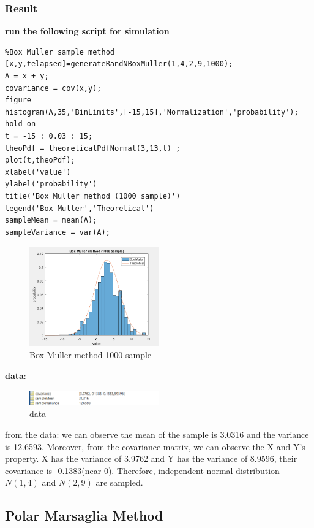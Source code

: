 \documentclass[twoside]{article}
\begin{document}
\begin{multicols*}{2}
\subsubsection{Result}
\noindent \textbf {run the following script for simulation}\\
\begin{lstlisting}
%Box Muller sample method
[x,y,telapsed]=generateRandNBoxMuller(1,4,2,9,1000);
A = x + y;
covariance = cov(x,y);
figure
histogram(A,35,'BinLimits',[-15,15],'Normalization','probability');
hold on
t = -15 : 0.03 : 15;
theoPdf = theoreticalPdfNormal(3,13,t) ;
plot(t,theoPdf);
xlabel('value')
ylabel('probability')
title('Box Muller method (1000 sample)')
legend('Box Muller','Theoretical')
sampleMean = mean(A);
sampleVariance = var(A);
\end{lstlisting}
\begin{figure}[H]
   \centering
   \includegraphics[width = 0.5\textwidth]{../data/solution1_1_1000.png}  
   \caption{Box Muller method 1000 sample}
\end{figure}
\noindent \textbf {data}:
\begin{figure}[H]
   \centering
   \includegraphics[width = 0.5\textwidth]{../data/solution1result.png}  
   \caption{data}
\end{figure}
from the data: we can observe the mean of the sample is 3.0316 and the variance is 12.6593. Moreover, from the covariance matrix, we can observe the X and Y's property. X has the variance of 3.9762 and Y has the variance of 8.9596, their covariance is -0.1383(near 0). Therefore, independent normal distribution $N(1,4)$ and $N(2,9)$ are sampled.  

\subsection{\normalsize{Polar Marsaglia Method}}

\end{multicols*}
\end{document}
